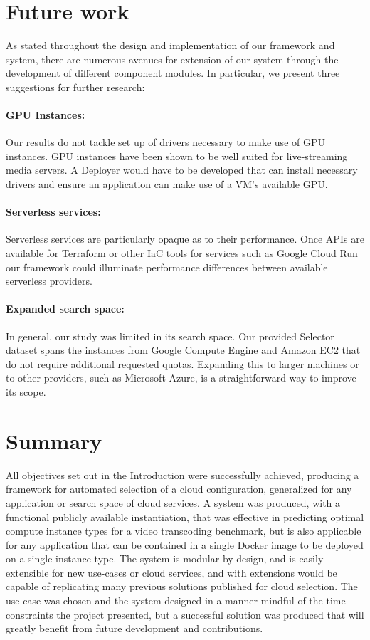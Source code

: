 \documentclass{report}
\begin{document}
\section{Future work}
As stated throughout the design and implementation of our framework and system, there are numerous avenues for extension of our system through the development of different component modules. In particular, we present three suggestions for further research:

\paragraph{GPU Instances:} Our results do not tackle set up of drivers necessary to make use of GPU instances. GPU instances have been shown to be well suited for live-streaming media servers\cite{Lottarini2018}. A Deployer would have to be developed that can install necessary drivers and ensure an application can make use of a VM's available GPU.
\paragraph{Serverless services:} Serverless services are particularly opaque as to their performance. Once APIs are available for Terraform or other IaC tools for services such as Google Cloud Run our framework could illuminate performance differences between available serverless providers.
\paragraph{Expanded search space:} In general, our study was limited in its search space. Our provided Selector dataset spans the instances from Google Compute Engine and Amazon EC2 that do not require additional requested quotas. Expanding this to larger machines or to other providers, such as Microsoft Azure, is a straightforward way to improve its scope. 
\section{Summary}
All objectives set out in the Introduction were successfully achieved, producing a framework for automated selection of a cloud configuration, generalized for any application or search space of cloud services. A system was produced, with a functional publicly available instantiation, that was effective in predicting optimal compute instance types for a video transcoding benchmark, but is also applicable for any application that can be contained in a single Docker image to be deployed on a single instance type. The system is modular by design, and is easily extensible for new use-cases or cloud services, and with extensions would be capable of replicating many previous solutions published for cloud selection. The use-case was chosen and the system designed in a manner mindful of the time-constraints the project presented, but a successful solution was produced that will greatly benefit from future development and contributions.
\newpage


\newpage
\end{document}
